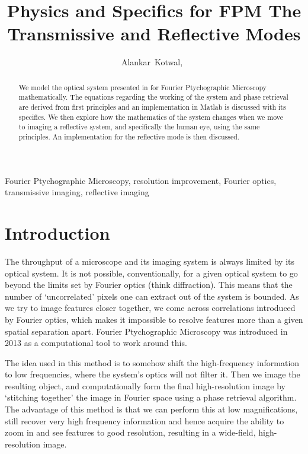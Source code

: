 \documentclass[11pt,a4paper,journal]{IEEEtran}
\title{Physics and Specifics for FPM \linebreak The Transmissive and Reflective Modes}
\author{Alankar~Kotwal,~\IEEEmembership{Indian Institute of Technology Bombay}}
\begin{document}
\maketitle

\begin{abstract}
We model the optical system presented in \cite{FPMPaper} for Fourier Ptychographic Microscopy mathematically. The equations regarding the working of the system and phase retrieval are derived from first principles and an implementation in Matlab is discussed with its specifics. We then explore how the mathematics of the system changes when we move to imaging a reflective system, and specifically the human eye, using the same principles. An implementation for the reflective mode is then discussed.
\end{abstract}

\begin{keywords}
Fourier Ptychographic Microscopy, resolution improvement, Fourier optics, transmissive imaging, reflective imaging
\end{keywords}

\section{Introduction}
The throughput of a microscope and its imaging system is always limited by its optical system. It is not possible, conventionally, for a given optical system to go beyond the limits set by Fourier optics (think diffraction). This means that the number of `uncorrelated' pixels one can extract out of the system is bounded. As we try to image features closer together, we come across correlations introduced by Fourier optics, which makes it impossible to resolve features more than a given spatial separation apart. Fourier Ptychographic Microscopy was introduced in 2013 as a computational tool to work around this.

The idea used in this method is to somehow shift the high-frequency information to low frequencies, where the system's optics will not filter it. Then we image the resulting object, and computationally form the final high-resolution image by `stitching together' the image in Fourier space using a phase retrieval algorithm. The advantage of this method is that we can perform this at low magnifications, still recover very high frequency information and hence acquire the ability to zoom in and see features to good resolution, resulting in a wide-field, high-resolution image.
\end{document}
